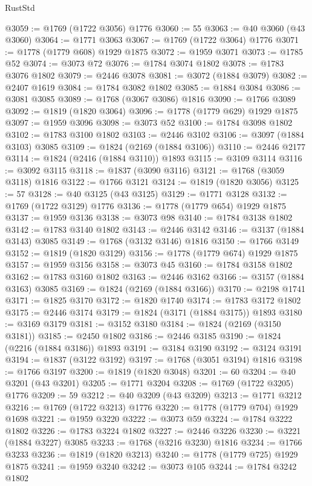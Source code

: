 \begin{lexlean}{RustStd}
\begin{coremodule}
@3059 := @1769 (@1722 @3056) @1776
@3060 := 55
@3063 := @40 @3060 (@43 @3060)
@3064 := @1771 @3063
@3067 := @1769 (@1722 @3064) @1776
@3071 := @1778 (@1779 @608) @1929 @1875
@3072 := @1959 @3071
@3073 := @1785 @52
@3074 := @3073 @72
@3076 := @1784 @3074 @1802
@3078 := @1783 @3076 @1802
@3079 := @2446 @3078
@3081 := @3072 (@1884 @3079)
@3082 := @2407 @1619
@3084 := @1784 @3082 @1802
@3085 := @1884 @3084
@3086 := @3081 @3085
@3089 := @1768 (@3067 @3086) @1816
@3090 := @1766 @3089
@3092 := @1819 (@1820 @3064)
@3096 := @1778 (@1779 @629) @1929 @1875
@3097 := @1959 @3096
@3098 := @3073 @52
@3100 := @1784 @3098 @1802
@3102 := @1783 @3100 @1802
@3103 := @2446 @3102
@3106 := @3097 (@1884 @3103) @3085
@3109 := @1824 (@2169 (@1884 @3106))
@3110 := @2446 @2177
@3114 := @1824 (@2416 (@1884 @3110)) @1893
@3115 := @3109 @3114
@3116 := @3092 @3115
@3118 := @1837 (@3090 @3116)
@3121 := @1768 (@3059 @3118) @1816
@3122 := @1766 @3121
@3124 := @1819 (@1820 @3056)
@3125 := 57
@3128 := @40 @3125 (@43 @3125)
@3129 := @1771 @3128
@3132 := @1769 (@1722 @3129) @1776
@3136 := @1778 (@1779 @654) @1929 @1875
@3137 := @1959 @3136
@3138 := @3073 @98
@3140 := @1784 @3138 @1802
@3142 := @1783 @3140 @1802
@3143 := @2446 @3142
@3146 := @3137 (@1884 @3143) @3085
@3149 := @1768 (@3132 @3146) @1816
@3150 := @1766 @3149
@3152 := @1819 (@1820 @3129)
@3156 := @1778 (@1779 @674) @1929 @1875
@3157 := @1959 @3156
@3158 := @3073 @45
@3160 := @1784 @3158 @1802
@3162 := @1783 @3160 @1802
@3163 := @2446 @3162
@3166 := @3157 (@1884 @3163) @3085
@3169 := @1824 (@2169 (@1884 @3166))
@3170 := @2198 @1741
@3171 := @1825 @3170
@3172 := @1820 @1740
@3174 := @1783 @3172 @1802
@3175 := @2446 @3174
@3179 := @1824 (@3171 (@1884 @3175)) @1893
@3180 := @3169 @3179
@3181 := @3152 @3180
@3184 := @1824 (@2169 (@3150 @3181))
@3185 := @2450 @1802
@3186 := @2446 @3185
@3190 := @1824 (@2216 (@1884 @3186)) @1893
@3191 := @3184 @3190
@3192 := @3124 @3191
@3194 := @1837 (@3122 @3192)
@3197 := @1768 (@3051 @3194) @1816
@3198 := @1766 @3197
@3200 := @1819 (@1820 @3048)
@3201 := 60
@3204 := @40 @3201 (@43 @3201)
@3205 := @1771 @3204
@3208 := @1769 (@1722 @3205) @1776
@3209 := 59
@3212 := @40 @3209 (@43 @3209)
@3213 := @1771 @3212
@3216 := @1769 (@1722 @3213) @1776
@3220 := @1778 (@1779 @704) @1929 @1698
@3221 := @1959 @3220
@3222 := @3073 @59
@3224 := @1784 @3222 @1802
@3226 := @1783 @3224 @1802
@3227 := @2446 @3226
@3230 := @3221 (@1884 @3227) @3085
@3233 := @1768 (@3216 @3230) @1816
@3234 := @1766 @3233
@3236 := @1819 (@1820 @3213)
@3240 := @1778 (@1779 @725) @1929 @1875
@3241 := @1959 @3240
@3242 := @3073 @105
@3244 := @1784 @3242 @1802

\end{coremodule}
\end{lexlean}
